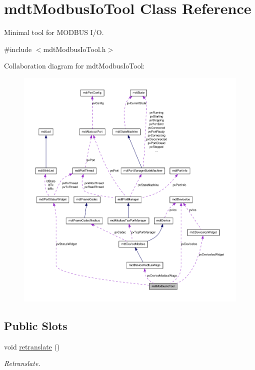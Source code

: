 \hypertarget{classmdt_modbus_io_tool}{
\section{mdtModbusIoTool Class Reference}
\label{classmdt_modbus_io_tool}
}


Minimal tool for MODBUS I/O.  




{\ttfamily \#include $<$mdtModbusIoTool.h$>$}



Collaboration diagram for mdtModbusIoTool:\nopagebreak
\begin{figure}[H]
\begin{center}
\leavevmode
\includegraphics[width=400pt]{classmdt_modbus_io_tool__coll__graph}
\end{center}
\end{figure}
\subsection*{Public Slots}
\begin{DoxyCompactItemize}
\item 
void \hyperlink{classmdt_modbus_io_tool_a5e0ccfb8e352242fffc3f65f442f4d2f}{retranslate} ()
\begin{DoxyCompactList}\small\item\em Retranslate. \end{DoxyCompactList}\end{DoxyCompactItemize}
